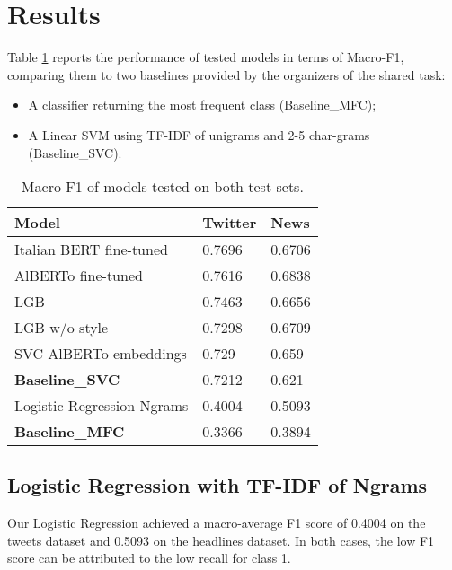 \documentclass[a4paper, 9pt, twocolumn, DIV=calc]{scrartcl}
\begin{document}







\section{Results}

Table \ref{tab:models_performance} reports the performance of tested models in terms of Macro-F1, comparing them to two baselines provided by the organizers of the shared task:

\begin{itemize}
    \item A classifier returning the most frequent class (Baseline\_MFC);
    \item A Linear SVM using TF-IDF of unigrams and 2-5 char-grams (Baseline\_SVC).
\end{itemize}

\begin{table}[h]
    \centering
    \begin{tabular}{lll}
        \toprule
        Model & Twitter & News\\
        \midrule
        Italian BERT fine-tuned & 0.7696 & 0.6706\\
        AlBERTo fine-tuned & 0.7616 & 0.6838\\
        LGB & 0.7463 & 0.6656\\
        LGB w/o style & 0.7298 & 0.6709\\
        SVC AlBERTo embeddings & 0.729 & 0.659\\
        \textbf{Baseline\_SVC} & 0.7212 & 0.621\\
        Logistic Regression Ngrams & 0.4004 & 0.5093\\
        \textbf{Baseline\_MFC} & 0.3366 & 0.3894\\
        \bottomrule
    \end{tabular}
    \caption{Macro-F1 of models tested on both test sets.}
    \label{tab:models_performance}
\end{table}

\subsection{Logistic Regression with TF-IDF of Ngrams}

Our Logistic Regression achieved a macro-average F1 score of 0.4004 on the tweets dataset and 0.5093 on the headlines dataset. In both cases, the low F1 score can be attributed to the low recall for class 1.
\end{document}
